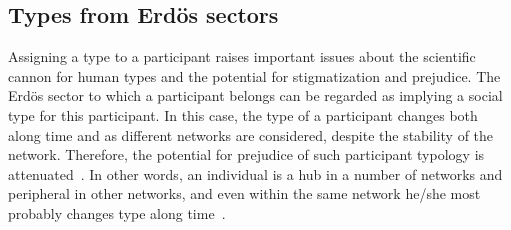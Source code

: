 \documentclass[%
	aip,
	jmp,%
	amsmath,amssymb,
	reprint,%
]{revtex4-1}
\begin{document}

																																																																																					\subsection{Types from Erd\"os sectors}\label{sec:pty}


																																																																																					Assigning a type to a participant raises important issues about the scientific cannon for human types and the potential for stigmatization and prejudice. The Erd\"os sector to which a participant belongs can be regarded as implying a social type for this participant.
																																																																																					In this case, the type of a participant changes both along time and as different networks are considered, despite the stability of the network. Therefore, the potential for prejudice of such participant typology is attenuated~\cite{adorno}. In other words, an individual is a hub in a number of networks and peripheral in other networks, and even within the same network he/she most probably changes type along time~\cite{animacoes}.
\end{document}
